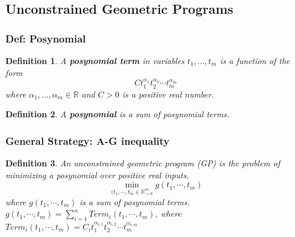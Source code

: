\documentclass[11pt,a4paper]{article}
\newtheorem{definition}{Definition}
\begin{document}
\subsection{Unconstrained Geometric Programs}
\subsubsection{Def: Posynomial}
\begin{definition}
    A \textbf{posynomial term} in variables $t_1,...,t_m$ is a function of the form $$Ct_1^{\alpha_1}t_2^{\alpha_2}\cdots t_m^{\alpha_m}$$ where $\alpha_1,...,\alpha_m\in \mathbb{R}$ and $C>0$ is a positive real number.
\end{definition}
\begin{definition}
    A \textbf{posynomial} is a sum of posynomial terms.
\end{definition}

\subsubsection{General Strategy: A-G inequality}
\begin{definition}
    An unconstrained geometric program (GP) is the problem of minimizing a posynomial over positive real inputs.
    $$\min_{(t_1,\cdots,t_m\in \mathbb{R}^m_{>0}}g(t_1,\cdots,t_m)$$
    where $g(t_1,\cdots,t_m)$ is a sum of posynomial terms. $g(t_1,\cdots,t_m)=\sum_{i=1}^n{Term}_i(t_1,\cdots,t_m)$, where ${Term}_i(t_1,\cdots,t_m)=C_i t_1^{\alpha_{i,1}}t_2^{\alpha_{i,2}}\cdots t_m^{\alpha_{i,m}}$
\end{definition}

\begin{center}
\end{center}
\end{document}
